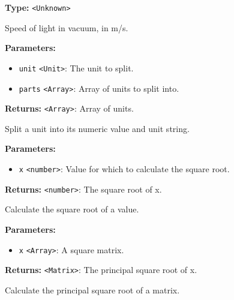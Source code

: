 \documentclass[12pt,a4paper]{article}
\begin{document}
\noindent \textbf{Type:} \texttt{<Unknown>}

\noindent Speed of light in vacuum, in m/s.

\vspace{5mm}
\noindent {}


\noindent \textbf{Parameters:}
\begin{itemize}
  \item \texttt{unit} \texttt{<Unit>}: The unit to split.
  \item \texttt{parts} \texttt{<Array>}: Array of units to split into.
\end{itemize}

\noindent \textbf{Returns:} \texttt{<Array>}: Array of units.

\noindent Split a unit into its numeric value and unit string.

\vspace{5mm}
\noindent {}


\noindent \textbf{Parameters:}
\begin{itemize}
  \item \texttt{x} \texttt{<number>}: Value for which to calculate the square root.
\end{itemize}

\noindent \textbf{Returns:} \texttt{<number>}: The square root of x.

\noindent Calculate the square root of a value.

\vspace{5mm}
\noindent {}


\noindent \textbf{Parameters:}
\begin{itemize}
  \item \texttt{x} \texttt{<Array>}: A square matrix.
\end{itemize}

\noindent \textbf{Returns:} \texttt{<Matrix>}: The principal square root of x.

\noindent Calculate the principal square root of a matrix.

\vspace{5mm}
\noindent {}
\end{document}
